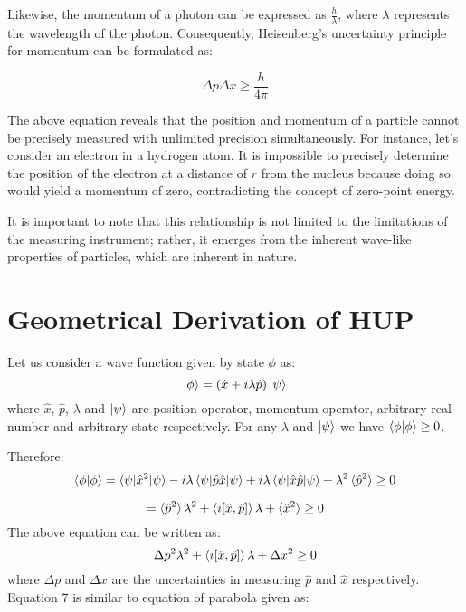 \documentclass{article}
\begin{document}
Likewise, the momentum of a photon can be expressed as $\frac{h}{\lambda}$, where $\lambda$ represents the wavelength of the photon. Consequently, Heisenberg's uncertainty principle for momentum can be formulated as:

\begin{equation}
\Delta p \Delta x \geq \frac{h}{4\pi} 
\end{equation}

The above equation reveals that the position and momentum of a particle cannot be precisely measured with unlimited precision simultaneously. For instance, let's consider an electron in a hydrogen atom. It is impossible to precisely determine the position of the electron at a distance of $r$ from the nucleus because doing so would yield a momentum of zero, contradicting the concept of zero-point energy.

It is important to note that this relationship is not limited to the limitations of the measuring instrument; rather, it emerges from the inherent wave-like properties of particles, which are inherent in nature.


\section{Geometrical Derivation of HUP}
Let us consider a wave function given by state $\phi$ as:
\begin{equation}
\ket{\phi}=(\hat{x}+i\lambda\hat{p})\ket{\psi}  
\end{equation}
where $\hat{x}$, $\hat{p}$, $\lambda$ and $\ket{\psi}$ are position operator, momentum operator, arbitrary real number and arbitrary state respectively. For any $\lambda$ and $\ket{\psi}$ we have $\braket{\phi|\phi}\geq 0$. 

Therefore:
\begin{equation}
\braket{\phi|\phi}=\braket{\psi|\hat{x}^2|\psi}-i\lambda\braket{\psi|\hat{p}\hat{x}|\psi}+i\lambda\braket{\psi|\hat{x}\hat{p}|\psi}+\lambda^2\braket{\hat{p}^2}\geq 0 
\end{equation}

\begin{equation}
=\braket{\hat{p}^2}\lambda^2+\braket{i[\hat{x},\hat{p}]}\lambda+\braket{\hat{x}^2}\geq 0    
\end{equation}
The above equation can be written as:
\begin{equation}
\Delta p^2 \lambda^2 + \braket{i[\hat{x},\hat{p}]}\lambda + \Delta x^2 \geq 0    
\end{equation}
where $\Delta p$ and $\Delta x$ are the uncertainties in measuring $\hat{p}$ and $\hat{x}$ respectively. Equation 7 is similar to equation of parabola given as:
\end{document}
